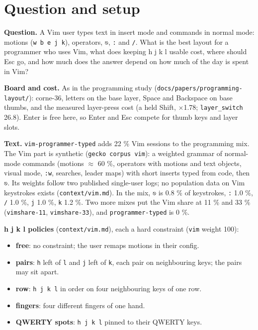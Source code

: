 \documentclass{gecko-paper}
\begin{document}
{\small
\section{Question and setup}

\textbf{Question.} A Vim user types text in insert mode and commands in normal mode: motions (\texttt{w\ b\ e\ j\ k}), operators, \texttt{⎋}, \texttt{:} and \texttt{/}. What is the best layout for a programmer who uses Vim, what does keeping h j k l usable cost, where should Esc go, and how much does the answer depend on how much of the day is spent in Vim?

\textbf{Board and cost.} As in the programming study (\texttt{docs/papers/programming-layout/}): corne-36, letters on the base layer, Space and Backspace on base thumbs, and the measured layer-press cost (a held Shift, $\times$1.78; \texttt{layer\_switch} 26.8). Enter is free here, so Enter and Esc compete for thumb keys and layer slots.

\textbf{Text.} \texttt{vim-programmer-typed} adds 22 \% Vim sessions to the programming mix. The Vim part is synthetic (\texttt{gecko\ corpus\ vim}): a weighted grammar of normal-mode commands (motions $\approx$ 60 \%, operators with motions and text objects, visual mode, \texttt{:w}, searches, leader maps) with short inserts typed from code, then \texttt{⎋}. Its weights follow two published single-user
logs; no population data on Vim keystrokes exists (\texttt{context/vim.md}). In the mix, \texttt{⎋} is 0.8 \% of keystrokes, \texttt{:} 1.0 \%, \texttt{/} 1.0 \%, \texttt{j} 1.0 \%, \texttt{k} 1.2 \%. Two more mixes put the Vim share at 11 \% and 33 \% (\texttt{vimshare-11}, \texttt{vimshare-33}), and \texttt{programmer-typed} is 0 \%.

\textbf{h j k l policies} (\texttt{context/vim.md}), each a hard constraint (\texttt{vim} weight 100):

\begin{itemize}
\setlength{\itemsep}{1pt}\setlength{\parskip}{0pt}
\item
  \textbf{free}: no constraint; the user remaps motions in their config.
\item
  \textbf{pairs}: \texttt{h} left of \texttt{l} and \texttt{j} left of \texttt{k}, each pair on neighbouring keys; the pairs may sit apart.
\item
  \textbf{row}: \texttt{h\ j\ k\ l} in order on four neighbouring keys of one row.
\item
  \textbf{fingers}: four different fingers of one hand.
\item
  \textbf{QWERTY spots}: \texttt{h\ j\ k\ l} pinned to their QWERTY keys.
\end{itemize}

}
\end{document}
